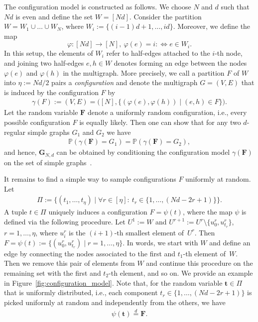 \documentclass[a4paper,
               10pt,
               pdftex,
               normalheadings,
               headsepline,
               footsepline,
               headinclude,
               footinclude,
               DIV=14,
               abstracton]
{scrartcl}
\newcommand{\rv}[1]{\bm{#1}}
\begin{document}
The configuration model is constructed as follows.
We choose $N$ and $d$ such that $Nd$ is even and define the set $W = [Nd]$.
Consider the partition $W = W_1 \cup \dots \cup W_N$, where $W_i := \{(i-1)d + 1, \dots, i d \}$.
Moreover, we define the map
\begin{equation}
    \label{eq:phiassign}
    \varphi:[Nd]\to[N],\ \varphi(e) = i :\Leftrightarrow e \in W_i.
\end{equation}
In this setup, the elements of $W_i$ refer to half-edges attached to the $i$-th node, and joining two half-edges $e,h \in W$ denotes forming an edge between the nodes $\varphi(e)$ and $\varphi(h)$ in the multigraph.
More precisely, we call a partition $F$ of $W$ into $\eta := Nd / 2$ pairs a \textit{configuration} and denote the multigraph $G=(V,E)$ that is induced by the configuration $F$ by
\begin{align}
    \gamma(F) := (V, E) = \Big([N], \{(\varphi(e), \varphi(h)) \mid (e,h) \in F\}\Big).
\end{align}
Let the random variable $\rv{F}$ denote a uniformly random configuration, i.e., every possible configuration $F$ is equally likely.
Then one can show that for any two $d$-regular simple graphs $G_1$ and $G_2$ we have
\begin{align}
    \mathbb{P}(\gamma(\rv{F}) = G_1) = \mathbb{P}(\gamma(\rv{F}) = G_2),
\end{align}
and hence, $\rv{G}_{N,d}$ can be obtained by conditioning the configuration model $\gamma(\rv{F})$ on the set of simple graphs~\cite[Corollary~11.2]{Frieze2015}.

It remains to find a simple way to sample configurations $F$ uniformly at random.
Let
\begin{align}
    \Pi := \Big\{(t_1, \dots, t_\eta) \mid\forall r\in [\eta]:\ t_r \in \{1,\dots, (Nd -2r + 1)\}\Big\}.
\end{align}
A tuple $t \in \Pi$ uniquely induces a configuration $F = \psi(t)$, where the map $\psi$ is defined via the following procedure.
Let $U^1 := W$ and $U^{r+1} := U^r \setminus \{u_0^r, u_{t_r}^r\}$, $r=1,\dots,\eta$, where $u_i^r$ is the $(i+1)\text{-th}$ smallest element of~$U^r$.
Then $F = \psi(t) := \{(u_0^r, u_{t_r}^r) \mid r=1,\dots,\eta\}$. 
In words, we start with $W$ and define an edge by connecting the nodes associated to the first and $t_1$-th element of~$W$. Then we remove this pair of elements from $W$ and continue this procedure on the remaining set with the first and $t_2$-th element, and so on.
We provide an example in Figure~\ref{fig:configuration_model}.
Note that, for the random variable $\rv{t} \in \Pi$ that is uniformly distributed, i.e., each component $t_r \in \{1,\dots, (Nd -2r + 1)\}$ is picked uniformly at random and independently from the others, we have
\begin{align}
    \psi(\rv{t}) \overset{d}{=} \rv{F}.
\end{align}
\end{document}
